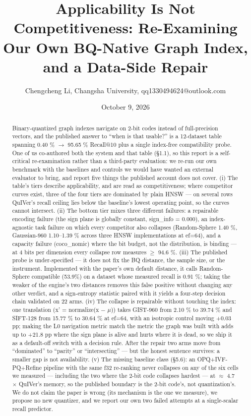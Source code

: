 \documentclass[
  10pt,
]{article}
\title{Applicability Is Not Competitiveness: Re-Examining Our Own
BQ-Native Graph Index, and a Data-Side Repair}
\author{Chengcheng Li, Changsha University, qq1330494624@outlook.com}
\date{October 9, 2026}
\begin{document}
\maketitle
\begin{abstract}
Binary-quantized graph indexes navigate on 2-bit codes instead of
full-precision vectors, and the published answer to ``when is that
usable?'' is a 12-dataset table spanning 0.40 \% $\rightarrow$ 95.65 \% Recall@10
plus a single index-free compatibility probe. One of us co-authored both
the system and that table (§1.1), so this report is a self-critical
re-examination rather than a third-party evaluation: we re-run our own
benchmark with the baselines and controls we would have wanted an
external evaluator to bring, and report five things the published
account does not cover. (i) The table's tiers describe applicability,
and are read as competitiveness; where competitor curves exist, three of
the four tiers are dominated by plain HNSW --- on several rows QuIVer's
recall ceiling lies below the baseline's lowest operating point, so the
curves cannot intersect. (ii) The bottom tier mixes three different
failures: a repairable encoding failure (the sign plane is globally
constant, sign\_info = 0.000), an index-agnostic task failure on which
every competitor also collapses (Random-Sphere 1.40 \%, Gaussian-960
1.10--1.39 \% across three HNSW implementations at ef=64), and a
capacity failure (coco\_nomic) where the bit budget, not the
distribution, is binding --- at 4 bits per dimension every collapse row
measures $\geq$ 94.6 \%. (iii) The published probe is under-specified --- it
does not fix the BQ distance, the sample size, or the instrument.
Implemented with the paper's own default distance, it calls
Random-Sphere compatible (53.9\%) on a dataset whose measured recall is
0.91 \%; taking the weaker of the engine's two distances removes this
false positive without changing any other verdict, and a sign-entropy
statistic paired with it yields a four-step decision chain validated on
22 arms. (iv) The collapse is repairable without touching the index: one
translation (x' = normalize(x $-$ $\mu$)) takes GIST-960 from 2.10 \% to 39.74
\% and SIFT-128 from 15.77 \% to 30.64 \% at ef=64, with an isotropic
control moving +0.03 pp; making the L0 navigation metric match the
metric the graph was built with adds up to +21.8 pp where the sign plane
is alive and hurts where it is dead, so we ship it as a default-off
switch with a decision rule. After the repair two arms move from
``dominated'' to ``parity'' or ``intersecting'' --- but the honest
sentence survives: a smaller gap is not availability. (v) The missing
baseline class (§5.6): an OPQ+IVF-PQ+Refine pipeline with the same f32
re-ranking never collapses on any of the six cells we measured ---
including the two where the 2-bit code collapses hardest --- at $\approx$ 4.7$\times$
QuIVer's memory, so the published boundary is the 2-bit code's, not
quantization's. We do not claim the paper is wrong (its mechanism is the
one we measure), we propose no new quantizer, and we report our own two
failed attempts at a single-scalar recall predictor.
\end{abstract}
\end{document}
